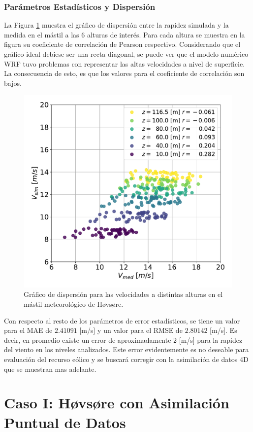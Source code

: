 \subsubsection{Parámetros Estadísticos y Dispersión}
La Figura \ref{fig:06_corr_hov} muestra el gráfico de dispersión entre la rapidez simulada y la medida en el mástil a las 6 alturas de interés. Para cada altura se muestra en la figura su coeficiente de correlación de Pearson respectivo. Considerando que el gráfico ideal debiese ser una recta diagonal, se puede ver que el modelo numérico WRF tuvo problemas con representar las altas velocidades a nivel de superficie. La consecuencia de esto, es que los valores para el coeficiente de correlación son bajos.
\begin{figure}[H]
	\centering
	\includegraphics[width=0.55\linewidth,page=1,trim={0cm 0cm 0cm 0cm},clip]{Imagenes/06/hov/corr}%
	\caption{Gráfico de dispersión para las velocidades a distintas alturas en el mástil meteorológico de Høvsøre.}
	\label{fig:06_corr_hov}
\end{figure}

Con respecto al resto de los parámetros de error estadísticos, se tiene un valor para el MAE de $2.41091$ [m/s] y un valor para el RMSE de $2.80142$ [m/s]. Es decir, en promedio existe un error de aproximadamente 2 [m/s] para la rapidez del viento en los niveles analizados. Este error evidentemente es no deseable para evaluación del recurso eólico y se buscará corregir con la asimilación de datos 4D que se muestran mas adelante.













\newpage
\section{Caso I: Høvsøre con Asimilación Puntual de Datos}
